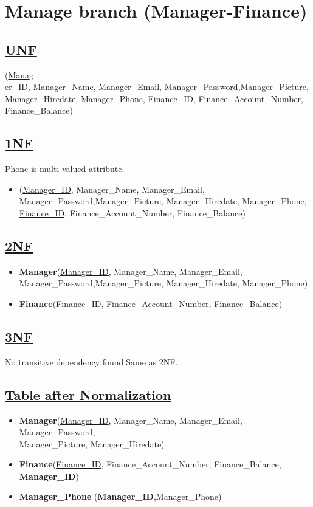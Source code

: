 \section{\texorpdfstring{\centering Manage branch (Manager-Finance)}{Manage branch (Manager-Finance)}}

\subsection*{\underline{UNF}}

(\underline{Manag\\er\_ID}, Manager\_Name, Manager\_Email, Manager\_Password,Manager\_Picture, Manager\_Hiredate, Manager\_Phone,
\underline{Finance\_ID}, Finance\_Account\_Number, Finance\_Balance)

\subsection*{\underline{1NF}}
Phone is multi-valued attribute.
\vskip 0.2in

\begin{itemize}
    \item
          (\underline{Manager\_ID}, Manager\_Name, Manager\_Email, Manager\_Password,Manager\_Picture, Manager\_Hiredate, Manager\_Phone,
          \underline{Finance\_ID}, Finance\_Account\_Number, Finance\_Balance)
\end{itemize}

\subsection*{\underline{2NF}}
\begin{itemize}
    \item \textbf{Manager}(\underline{Manager\_ID}, Manager\_Name, Manager\_Email, Manager\_Password,Manager\_Picture, Manager\_Hiredate, Manager\_Phone)
    \item \textbf{Finance}(\underline{Finance\_ID}, Finance\_Account\_Number, Finance\_Balance)
\end{itemize}

\subsection*{\underline{3NF}}
No transitive dependency found.Same as 2NF.

\subsection*{\underline{Table after Normalization}}
\begin{itemize}
    \item \textbf{Manager}(\underline{Manager\_ID}, Manager\_Name, Manager\_Email, Manager\_Password,\\Manager\_Picture, Manager\_Hiredate)
    \item \textbf{Finance}(\underline{Finance\_ID}, Finance\_Account\_Number, Finance\_Balance,\textbf{ Manager\_ID})
    \item \textbf{Manager\_Phone} (\textbf{Manager\_ID},{Manager\_Phone})
\end{itemize}
\clearpage